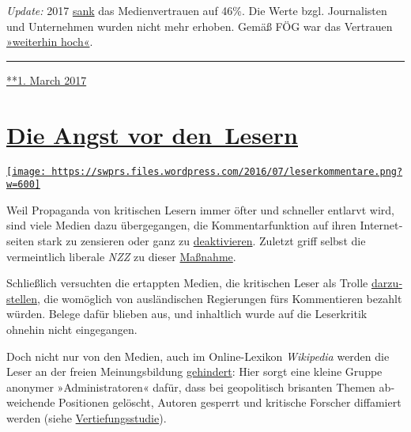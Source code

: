 \emph{Update:} 2017
\href{http://www.digitalnewsreport.org/survey/2017/switzerland-2017/}{sank}
das Medienvertrauen auf 46\%. Die Werte bzgl. Journalisten und
Unter­neh­men wurden nicht mehr erhoben. Gemäß FÖG war das Vertrauen
\href{http://www.foeg.uzh.ch/dam/jcr:0d0e5a10-27be-4e97-b264-b2cf7de96bbd/Broschur_Jahrbuch_foeg_deutsch_2017_ohne_Sperrvermerk.pdf}{»weiterhin
hoch«}.

\begin{center}\rule{0.5\linewidth}{\linethickness}\end{center}

\href{https://swprs.org/2017/03/01/schweizer-medien-vertrauen/}{**1.
March 2017}

\hypertarget{die-angst-vor-den-lesern}{%
\section{\texorpdfstring{\href{https://swprs.org/2017/03/01/leserkommentare/}{Die
Angst vor
den~Lesern}}{Die Angst vor den~Lesern}}\label{die-angst-vor-den-lesern}}

\href{https://swprs.org/2017/03/01/leserkommentare/}{\texttt{[image: https://swprs.files.wordpress.com/2016/07/leserkommentare.png?w=600]}}

Weil Propaganda von kritischen Lesern immer öfter und schneller entlarvt
wird, sind viele Medien dazu über­ge­gangen, die Kommentar­funktion auf
ihren Inter­net­­seiten stark zu zensieren oder ganz zu
\href{https://www.heise.de/tp/features/Konzentriertes-Gejammer-NZZ-schliesst-Kommentarspalte-3618957.html}{deaktivieren}.
Zuletzt griff selbst die vermeintlich liberale \emph{NZZ} zu dieser
\href{https://www.heise.de/tp/features/Konzentriertes-Gejammer-NZZ-schliesst-Kommentarspalte-3618957.html}{Maßnahme}.

Schließlich versuchten die ertappten Medien, die kri­ti­schen Leser als
Trolle
\href{https://www.nzz.ch/international/putins-internetpiraten-1.18324628}{dar­zu­stellen},
die womöglich von aus­län­dischen Re­gie­rungen fürs Kom­men­tieren
bezahlt würden. Be­lege da­für blie­ben aus, und inhaltlich wurde auf
die Leser­kritik ohnehin nicht ein­ge­gangen.

Doch nicht nur von den Medien, auch im Online-Lexikon \emph{Wikipedia}
werden die Leser an der freien Meinungs­bil­dung
\href{https://swprs.org/propaganda-in-der-wikipedia/}{gehindert}: Hier
sorgt eine kleine Gruppe anonymer »Adminis­tra­toren« dafür, dass bei
geo­po­li­tisch brisanten Themen ab­wei­chende Positionen gelöscht,
Autoren gesperrt und kritische Forscher diffamiert werden (siehe
\href{https://swprs.org/propaganda-in-der-wikipedia/}{Vertiefungsstudie}).

